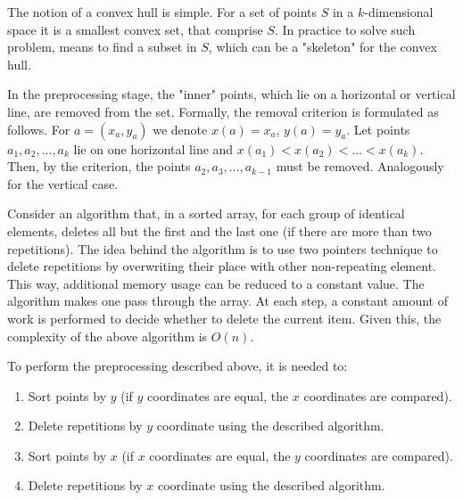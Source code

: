 \documentclass[a4paper,english,numberwithinsect,notab]{eurocg20-submission}
\begin{document}
	The notion of a convex hull is simple. For a set of points $S$ in a $k$-dimensional space it is a smallest convex set, that comprise $S$. In practice to solve such problem, means to find a subset in $S$, which can be a "skeleton" for the convex hull.
	
	
	
	
	In the preprocessing stage, the "inner" points, which lie on a horizontal or vertical line, are removed from the set. Formally, the removal criterion is formulated as follows. For $a = (x_a, y_a)$ we denote $x(a)=x_a$, $y(a)=y_a$. Let points $a_1, a_2, ..., a_k$ lie on one horizontal line and $x(a_1) < x(a_2) <... <x (a_k) $. Then, by the criterion, the points $a_2, a_3, ..., a_{k-1}$ must be removed. Analogously for the vertical case.
	
	Consider an algorithm that, in a sorted array, for each group of identical elements, deletes all but the first and the last one (if there are more than two repetitions). The idea behind the algorithm is to use two pointers technique to delete repetitions by overwriting their place with other non-repeating element. This way, additional memory usage can be reduced to a constant value. The algorithm makes one pass through the array. At each step, a constant amount of work is performed to decide whether to delete the current item. Given this, the complexity of the above algorithm is $O(n)$.
	
	To perform the preprocessing described above, it is needed to:
	
	\begin{enumerate}
		\item
		Sort points by $y$ (if $y$ coordinates are equal, the $x$ coordinates are compared).
		\item
		Delete repetitions by $y$ coordinate using the described algorithm.
		\item
		Sort points by $x$ (if $x$ coordinates are equal, the $y$ coordinates are compared).
		\item
		Delete repetitions by $x$ coordinate using the described algorithm.
	\end{enumerate}
	
\end{document}
